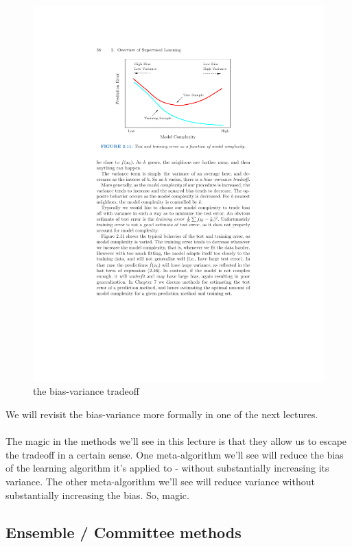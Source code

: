 \documentclass[11pt]{article}
\begin{document}
\begin{figure}[H]
  \centering
  \includegraphics[width=4.5in]{ESL_bias_variance.pdf}  
  \caption{the bias-variance tradeoff}
\end{figure}

We will revisit the bias-variance more formally in one of the next lectures.
\\~\\
The magic in the methods we'll see in this lecture is that they allow us to
escape the tradeoff in a certain sense. One meta-algorithm we'll see will
reduce the bias of the learning algorithm it's applied to - without
substantially increasing its variance. The other meta-algorithm we'll see will
reduce variance without substantially increasing the bias. So, magic.

\subsection{Ensemble / Committee methods}
\end{document}
